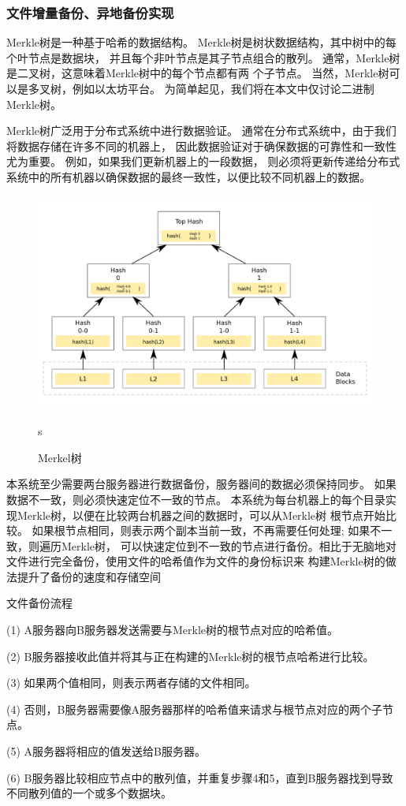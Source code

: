 \subsubsection{文件增量备份、异地备份实现}
Merkle树是一种基于哈希的数据结构。 Merkle树是树状数据结构，其中树中的每个叶节点是数据块，
并且每个非叶节点是其子节点组合的散列。 通常，Merkle树是二叉树，这意味着Merkle树中的每个节点都有两
个子节点。 当然，Merkle树可以是多叉树，例如以太坊平台。 为简单起见，我们将在本文中仅讨论二进制Merkle树。

Merkle树广泛用于分布式系统中进行数据验证\cite{r20,r21}。 通常在分布式系统中，由于我们将数据存储在许多不同的机器上，
因此数据验证对于确保数据的可靠性和一致性尤为重要。 例如，如果我们更新机器上的一段数据，
则必须将更新传递给分布式系统中的所有机器以确保数据的最终一致性，以便比较不同机器上的数据。
\begin{figure}[H]
    \centering
    \includegraphics[width=130mm]{./figures/merkle_tree.png}
    \caption{Merkel树}
    \label{android_videos}s
  \end{figure}

本系统至少需要两台服务器进行数据备份，服务器间的数据必须保持同步。 如果数据不一致，则必须快速定位不一致的节点。
本系统为每台机器上的每个目录实现Merkle树，以便在比较两台机器之间的数据时，可以从Merkle树
根节点开始比较。 如果根节点相同，则表示两个副本当前一致，不再需要任何处理; 如果不一致，则遍历Merkle树，
可以快速定位到不一致的节点进行备份。相比于无脑地对文件进行完全备份，使用文件的哈希值作为文件的身份标识来
构建Merkle树的做法提升了备份的速度和存储空间

文件备份流程
\par (1) A服务器向B服务器发送需要与Merkle树的根节点对应的哈希值。
\par (2) B服务器接收此值并将其与正在构建的Merkle树的根节点哈希进行比较。
\par (3) 如果两个值相同，则表示两者存储的文件相同。
\par (4) 否则，B服务器需要像A服务器那样的哈希值来请求与根节点对应的两个子节点。
\par (5) A服务器将相应的值发送给B服务器。
\par (6) B服务器比较相应节点中的散列值，并重复步骤4和5，直到B服务器找到导致不同散列值的一个或多个数据块。
